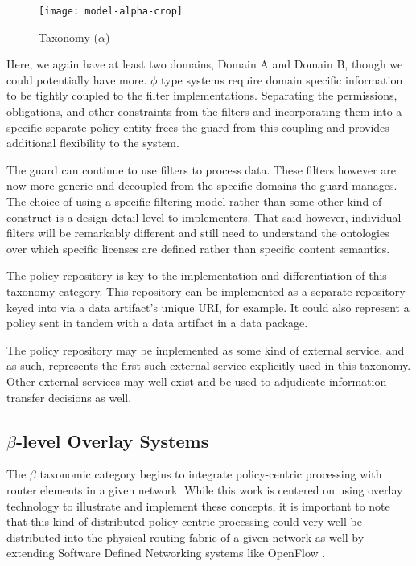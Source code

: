 \begin{figure}[!t]
\centering
\texttt{[image: model-alpha-crop]}
\caption{Taxonomy ($\alpha$)}
\label{fig:model:taxonomy-alpha}
\end{figure}

Here, we again have at least two domains, Domain A and Domain B, though we could potentially have more.  $\phi$ type systems require domain specific information to be tightly coupled to the filter implementations.  Separating the permissions, obligations, and other constraints from the filters and incorporating them into a specific separate policy entity frees the guard from this coupling and provides additional flexibility to the system.

The guard can continue to use filters to process data.  These filters however are now more generic and decoupled from the specific domains the guard manages.  The choice of using a specific filtering model rather than some other kind of construct is a design detail level to implementers.  That said however, individual filters will be remarkably different and still need to understand the ontologies over which specific licenses are defined rather than specific content semantics.

The policy repository is key to the implementation and differentiation of this taxonomy category.  This repository can be implemented as a separate repository keyed into via a data artifact's unique URI, for example.  It could also represent a policy sent in tandem with a data artifact in a data package.

The policy repository may be implemented as some kind of external service, and as such, represents the first such external service explicitly used in this taxonomy.  Other external services may well exist and be used to adjudicate information transfer decisions as well.

\subsection{$\beta$-level Overlay Systems}
The $\beta$ taxonomic category begins to integrate policy-centric processing with router elements in a given network.  While this work is centered on using overlay technology to illustrate and implement these concepts, it is important to note that this kind of distributed policy-centric processing could very well be distributed into the physical routing fabric of a given network as well by extending Software Defined Networking systems like OpenFlow \cite{proposal:openflow}.

